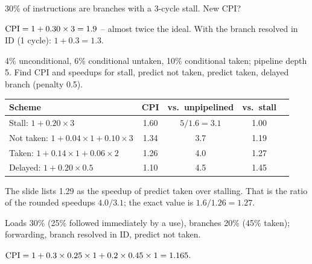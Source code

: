 \begin{exercise}
30\% of instructions are branches with a 3-cycle stall. New CPI?
\end{exercise}
\begin{solution}
$\mathrm{CPI} = 1 + 0.30\times3 = 1.9$ -- almost twice the ideal. With the branch
resolved in ID (1 cycle): $1+0.3 = 1.3$.
\end{solution}

\begin{exercise}
4\% unconditional, 6\% conditional untaken, 10\% conditional taken;
pipeline depth 5. Find CPI and speedups for stall, predict not taken,
predict taken, delayed branch (penalty 0.5).
\end{exercise}
\begin{solution}
\begin{tabular}[t]{@{}lcccc@{}}
Scheme & CPI & vs.\ unpipelined & vs.\ stall \\
\hline
Stall: $1+0.20\times3$ & 1.60 & $5/1.6=3.1$ & 1.00 \\
Not taken: $1+0.04\times1+0.10\times3$ & 1.34 & 3.7 & 1.19 \\
Taken: $1+0.14\times1+0.06\times2$ & 1.26 & 4.0 & 1.27 \\
Delayed: $1+0.20\times0.5$ & 1.10 & 4.5 & 1.45 \\
\end{tabular}


\end{solution}
\begin{remark}
\slidefix{} The slide lists 1.29 as the speedup of predict taken over stalling.
That is the ratio of the rounded speedups $4.0/3.1$; the exact value is
$1.6/1.26=1.27$.
\end{remark}

\begin{exercise}
Loads 30\% (25\% followed immediately by a use), branches 20\% (45\%
taken); forwarding, branch resolved in ID, predict not taken.
\end{exercise}
\begin{solution}
$\mathrm{CPI} = 1 + 0.3\times0.25\times1 + 0.2\times0.45\times1 = 1.165$.
\end{solution}


